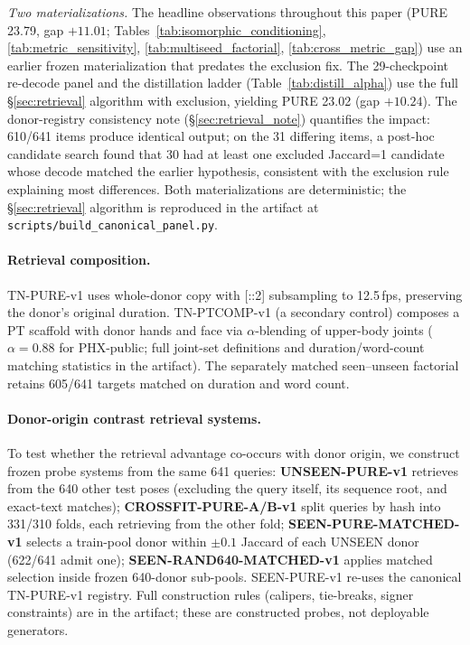 \documentclass[pdflatex,sn-chicago]{sn-jnl}
\begin{document}
\emph{Two materializations.} The headline observations throughout this paper (PURE 23.79, gap $+11.01$; Tables~\ref{tab:isomorphic_conditioning}, \ref{tab:metric_sensitivity}, \ref{tab:multiseed_factorial}, \ref{tab:cross_metric_gap}) use an earlier frozen materialization that predates the exclusion fix. The 29-checkpoint re-decode panel and the distillation ladder (Table~\ref{tab:distill_alpha}) use the full \S\ref{sec:retrieval} algorithm with exclusion, yielding PURE 23.02 (gap $+10.24$). The donor-registry consistency note (\S\ref{sec:retrieval_note}) quantifies the impact: 610/641 items produce identical output; on the 31 differing items, a post-hoc candidate search found that 30 had at least one excluded Jaccard=1 candidate whose decode matched the earlier hypothesis, consistent with the exclusion rule explaining most differences. Both materializations are deterministic; the \S\ref{sec:retrieval} algorithm is reproduced in the artifact at \texttt{scripts/build\_canonical\_panel.py}.

\paragraph{Retrieval composition.}
\label{sec:composition}
TN-PURE-v1 uses whole-donor copy with [::2] subsampling to 12.5\,fps, preserving the donor's original duration. TN-PTCOMP-v1 (a secondary control) composes a PT scaffold with donor hands and face via $\alpha$-blending of upper-body joints ($\alpha{=}0.88$ for PHX-public; full joint-set definitions and duration/word-count matching statistics in the artifact). The separately matched seen--unseen factorial retains 605/641 targets matched on duration and word count.

\paragraph{Donor-origin contrast retrieval systems.}
\label{sec:exposure_systems}
To test whether the retrieval advantage co-occurs with donor origin, we construct frozen probe systems from the same 641 queries: \textbf{UNSEEN-PURE-v1} retrieves from the 640 other test poses (excluding the query itself, its sequence root, and exact-text matches); \textbf{CROSSFIT-PURE-A/B-v1} split queries by hash into 331/310 folds, each retrieving from the other fold; \textbf{SEEN-PURE-MATCHED-v1} selects a train-pool donor within $\pm0.1$ Jaccard of each UNSEEN donor (622/641 admit one); \textbf{SEEN-RAND640-MATCHED-v1} applies matched selection inside frozen 640-donor sub-pools. SEEN-PURE-v1 re-uses the canonical TN-PURE-v1 registry. Full construction rules (calipers, tie-breaks, signer constraints) are in the artifact; these are constructed probes, not deployable generators.
\end{document}
